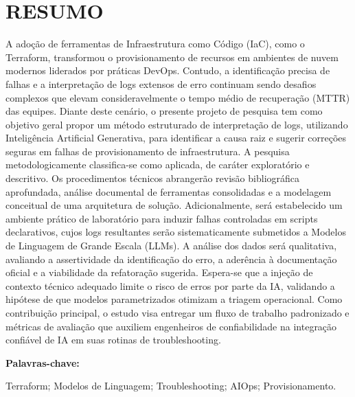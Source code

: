 \section*{RESUMO}
\thispagestyle{empty}

A adoção de ferramentas de Infraestrutura como Código (IaC), como o Terraform, transformou o provisionamento de recursos em ambientes de nuvem modernos liderados por práticas DevOps. Contudo, a identificação precisa de falhas e a interpretação de logs extensos de erro continuam sendo desafios complexos que elevam consideravelmente o tempo médio de recuperação (MTTR) das equipes. Diante deste cenário, o presente projeto de pesquisa tem como objetivo geral propor um método estruturado de interpretação de logs, utilizando Inteligência Artificial Generativa, para identificar a causa raiz e sugerir correções seguras em falhas de provisionamento de infraestrutura. A pesquisa metodologicamente classifica-se como aplicada, de caráter exploratório e descritivo. Os procedimentos técnicos abrangerão revisão bibliográfica aprofundada, análise documental de ferramentas consolidadas e a modelagem conceitual de uma arquitetura de solução. Adicionalmente, será estabelecido um ambiente prático de laboratório para induzir falhas controladas em scripts declarativos, cujos logs resultantes serão sistematicamente submetidos a Modelos de Linguagem de Grande Escala (LLMs). A análise dos dados será qualitativa, avaliando a assertividade da identificação do erro, a aderência à documentação oficial e a viabilidade da refatoração sugerida. Espera-se que a injeção de contexto técnico adequado limite o risco de erros por parte da IA, validando a hipótese de que modelos parametrizados otimizam a triagem operacional. Como contribuição principal, o estudo visa entregar um fluxo de trabalho padronizado e métricas de avaliação que auxiliem engenheiros de confiabilidade na integração confiável de IA em suas rotinas de troubleshooting.

\vspace{0.4cm}

\noindent \textbf{Palavras-chave:}
\par
\noindent Terraform; Modelos de Linguagem; Troubleshooting; AIOps; Provisionamento.
